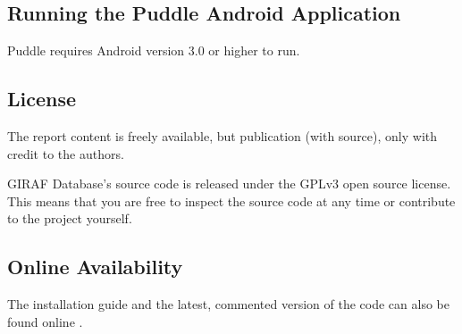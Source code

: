 \subsection{Running the Puddle Android Application}
Puddle requires Android version 3.0 or higher to run.

\subsection{License}
The report content is freely available, but publication (with source), only with credit to the authors.

GIRAF Database's source code is released under the GPLv3 \cite{GNUlicense} open source license. This means that you are free to inspect the source code at any time or contribute to the project yourself.

\subsection*{Online Availability} The installation guide and the latest, commented version of the code can also be found online \cite{install}.